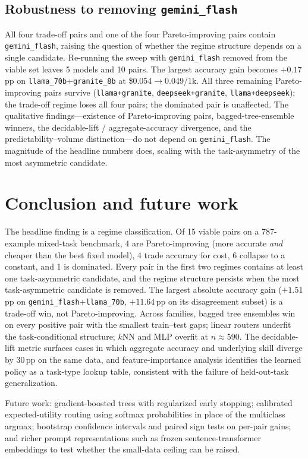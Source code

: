 \documentclass[11pt]{article}
\begin{document}
\subsection{Robustness to removing \texttt{gemini\_flash}}
\label{sec:robustness-no-gemini}
All four trade-off pairs and one of the four Pareto-improving pairs contain \texttt{gemini\_flash}, raising the question of whether the regime structure depends on a single candidate. Re-running the sweep with \texttt{gemini\_flash} removed from the viable set leaves 5 models and 10 pairs. The largest accuracy gain becomes $+0.17$\,pp on \texttt{llama\_70b}+\texttt{granite\_8b} at \$0.054$\to$0.049/1k. All three remaining Pareto-improving pairs survive (\texttt{llama+granite}, \texttt{deepseek+granite}, \texttt{llama+deepseek}); the trade-off regime loses all four pairs; the dominated pair is unaffected. The qualitative findings---existence of Pareto-improving pairs, bagged-tree-ensemble winners, the decidable-lift / aggregate-accuracy divergence, and the predictability--volume distinction---do not depend on \texttt{gemini\_flash}. The magnitude of the headline numbers does, scaling with the task-asymmetry of the most asymmetric candidate.

\section{Conclusion and future work}
The headline finding is a regime classification. Of 15 viable pairs on a 787-example mixed-task benchmark, 4 are Pareto-improving (more accurate \emph{and} cheaper than the best fixed model), 4 trade accuracy for cost, 6 collapse to a constant, and 1 is dominated. Every pair in the first two regimes contains at least one task-asymmetric candidate, and the regime structure persists when the most task-asymmetric candidate is removed. The largest absolute accuracy gain ($+1.51$\,pp on \texttt{gemini\_flash}+\texttt{llama\_70b}, $+11.64$\,pp on its disagreement subset) is a trade-off win, not Pareto-improving. Across families, bagged tree ensembles win on every positive pair with the smallest train--test gaps; linear routers underfit the task-conditional structure; $k$NN and MLP overfit at $n\approx 590$. The decidable-lift metric surfaces cases in which aggregate accuracy and underlying skill diverge by $30$\,pp on the same data, and feature-importance analysis identifies the learned policy as a task-type lookup table, consistent with the failure of held-out-task generalization.

Future work: gradient-boosted trees with regularized early stopping; calibrated expected-utility routing using softmax probabilities in place of the multiclass argmax; bootstrap confidence intervals and paired sign tests on per-pair gains; and richer prompt representations such as frozen sentence-transformer embeddings \citep{shnitzer2023llm} to test whether the small-data ceiling can be raised.
\end{document}

